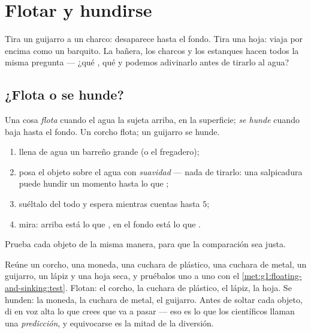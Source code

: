 \chapter{Flotar y hundirse}\label{ch:g1:floating-and-sinking}

Tira un guijarro a un charco: desaparece hasta el fondo. Tira una
hoja: viaja por encima como un barquito. La bañera, los charcos y los
estanques hacen todos la misma pregunta --- ¿qué , qué
 y podemos adivinarlo antes de tirarlo al agua?

\section{¿Flota o se hunde?}

\begin{definition}\label{def:g1:floating-and-sinking:words}
Una cosa \emph{flota} cuando el agua la sujeta arriba,
en la superficie; \emph{se hunde} cuando baja hasta el
fondo. Un corcho flota; un guijarro se hunde.
\end{definition}

\begin{method}\label{met:g1:floating-and-sinking:test}
\begin{enumerate}
  \item llena de agua un barreño grande (o el fregadero);
  \item posa el objeto sobre el agua con \emph{suavidad} --- nada de
        tirarlo: una salpicadura puede hundir un momento hasta lo que
        ;
  \item suéltalo del todo y espera mientras cuentas hasta $5$;
  \item mira: arriba está lo que , en el fondo está lo que .
\end{enumerate}
Prueba cada objeto de la misma manera, para que la comparación sea
justa.
\end{method}

\begin{example}\label{ex:g1:floating-and-sinking:sorting}
Reúne un corcho, una moneda, una cuchara de plástico, una cuchara de
metal, un guijarro, un lápiz y una hoja seca, y pruébalos uno a uno
con el \cref{met:g1:floating-and-sinking:test}. Flotan: el corcho, la
cuchara de plástico, el lápiz, la hoja. Se hunden: la moneda, la
cuchara de metal, el guijarro. Antes de soltar cada objeto, di en voz
alta lo que crees que va a pasar --- eso es lo que los científicos
llaman una \emph{predicción}, y equivocarse es la mitad de la
diversión.
\end{example}


